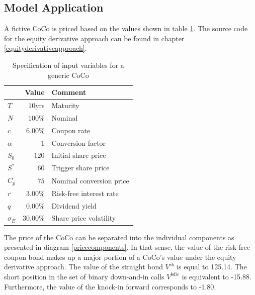 \subsection{Model Application}
A fictive CoCo is priced based on the values shown in table \ref{equityexample}. The source code for the equity derivative approach can be found in chapter \ref{equityderivativeapproach}. 
\begin{table}[H]
 \setlength{\extrarowheight}{2.5pt}
 \centering
 \begin{tabular}{lrl}
  \toprule
    & \textbf{Value} & \textbf{Comment} \\
  \midrule
   $T$ & $10$yrs & Maturity \\
   $N$ & $100\%$ & Nominal \\   
   $c$ & $6.00\%$ & Coupon rate \\
   $\alpha$ & $1$ & Conversion factor \\ 
   $S_0$ & $120$ & Initial share price \\
   $S^*$ & $60$ & Trigger share price \\
   $C_p$ & $75$ & Nominal conversion price \\
   $r$ & $3.00\%$ & Risk-free interest rate\\
   $q$ & $0.00\%$ & Dividend yield \\
   $\sigma_E$& $30.00\%$ & Share price volatility \\
  \bottomrule
 \end{tabular}
 \caption[Specification of input variables for a generic CoCo under the equity derivative approach]{Specification of input variables for a generic CoCo}
 \label{equityexample}
\end{table}
The price of the CoCo can be separated into the individual components as presented in diagram \ref{pricecomponents}. In that sense, the value of the risk-free coupon bond makes up a major portion of a CoCo's value under the equity derivative approach. The value of the straight bond $V^{sb}$ is equal to 125.14. The short position in the set of binary down-and-in calls $V^{bdic}$ is equivalent to -15.88. Furthermore, the value of the knock-in forward corresponds to -1.80.

